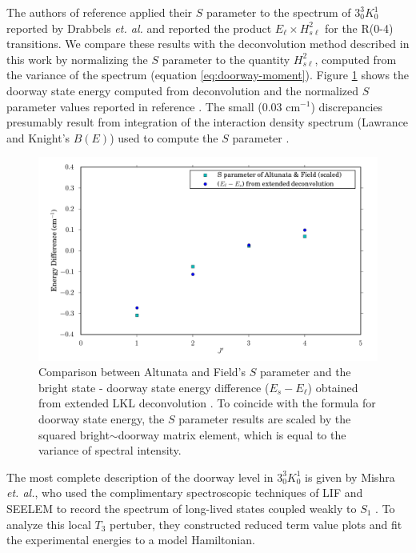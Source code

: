 \documentclass[12pt]{mitthesis}
\begin{document}
The authors of reference \cite{altunata01} applied their $S$ parameter
to the spectrum of $3^3_0K^1_0$ reported by Drabbels \emph{et. al.}
and reported the product $E_{\ell} \times H_{s\ell}^2$ for the R(0-4)
transitions.  We compare these results with the deconvolution method
described in this work by normalizing the $S$ parameter to the
quantity $H_{s\ell}^2$, computed from the variance of the spectrum
(equation \ref{eq:doorway-moment}).  Figure \ref{fig:selen-comparison}
shows the doorway state energy computed from deconvolution and the
normalized $S$ parameter values reported in reference
\cite{altunata01}.  The small (0.03 cm$^{-1}$) discrepancies
presumably result from integration of the interaction density spectrum
(Lawrance and Knight's $B(E)$) used to compute the $S$ parameter
\cite{lawrance85}.

\begin{figure}
  \caption{Comparison between Altunata and Field's $S$ parameter and
    the bright state - doorway state energy difference ($E_s -
    E_{\ell}$) obtained from extended LKL deconvolution
    \cite{altunata01}.  To coincide with the formula for doorway state
    energy, the $S$ parameter results are scaled by the squared
    bright$\sim$doorway matrix element, which is equal to the variance
    of spectral intensity.}
  \label{fig:selen-comparison}
  \centering
  \includegraphics[width=6.5in]{selen-comparison.png}
\end{figure}

The most complete description of the doorway level in $3^3_0K^1_0$ is
given by Mishra \emph{et. al.}, who used the complimentary
spectroscopic techniques of LIF and SEELEM to record the spectrum of
long-lived states coupled weakly to $S_1$ \cite{mishra04}.  To analyze
this local $T_3$ pertuber, they constructed reduced term value plots
and fit the experimental energies to a model Hamiltonian.
\end{document}
